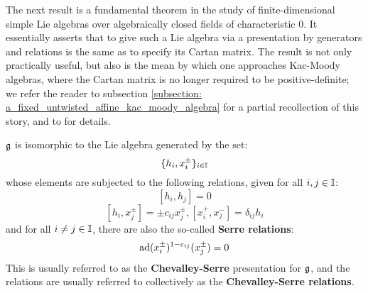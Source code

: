         The next result is a fundamental theorem in the study of finite-dimensional simple Lie algebras over algebraically closed fields of characteristic $0$. It essentially asserts that to give such a Lie algebra via a presentation by generators and relations is the same as to specify its Cartan matrix. The result is not only practically useful, but also is the mean by which one approaches Kac-Moody algebras, where the Cartan matrix is no longer required to be positive-definite; we refer the reader to subsection \ref{subsection: a_fixed_untwisted_affine_kac_moody_algebra} for a partial recollection of this story, and to \cite[Chapters 1-8]{kac_infinite_dimensional_lie_algebras} for details. 
        \begin{theorem} \label{theorem: serre_theorem_for_finite_dimensional_simple_lie_algebras}
            $\mathfrak{g}$ is isomorphic to the Lie algebra generated by the set:
                $$\{h_i, x_i^{\pm}\}_{i \in \mathbb{I}}$$
            whose elements are subjected to the following relations, given for all $i, j \in \mathbb{I}$:
                $$[h_i, h_j] = 0$$
                $$[h_i, x_j^{\pm}] = \pm c_{ij} x_j^{\pm}, [x_i^+, x_j^-] = \delta_{ij} h_i$$
            and for all $i \not = j \in \mathbb{I}$, there are also the so-called \textbf{Serre relations}:
                $$\mathrm{ad}(x_i^{\pm})^{1 - c_{ij}}(x_j^{\pm}) = 0$$
            This is usually referred to as the \textbf{Chevalley-Serre} presentation for $\mathfrak{g}$, and the relations are usually referred to collectively as the \textbf{Chevalley-Serre relations}.
        \end{theorem}

